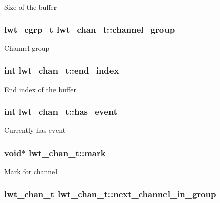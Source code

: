 Size of the buffer \hypertarget{structlwt__channel_a6e34c7480bc23f6ea1db12c69adec0d9}{
\subsubsection[{channel\+\_\+group}]{\setlength{\rightskip}{0pt plus 5cm}lwt\+\_\+cgrp\+\_\+t lwt\+\_\+chan\+\_\+t\+::channel\+\_\+group}}\label{structlwt__channel_a6e34c7480bc23f6ea1db12c69adec0d9}
Channel group \hypertarget{structlwt__channel_abb64ed65a8a46420c6dddf1758de401e}{
\subsubsection[{end\+\_\+index}]{\setlength{\rightskip}{0pt plus 5cm}int lwt\+\_\+chan\+\_\+t\+::end\+\_\+index}}\label{structlwt__channel_abb64ed65a8a46420c6dddf1758de401e}
End index of the buffer \hypertarget{structlwt__channel_a188eb6696d72cbe1d1295fb2736ec20c}{
\subsubsection[{has\+\_\+event}]{\setlength{\rightskip}{0pt plus 5cm}int lwt\+\_\+chan\+\_\+t\+::has\+\_\+event}}\label{structlwt__channel_a188eb6696d72cbe1d1295fb2736ec20c}
Currently has event \hypertarget{structlwt__channel_a83384d85ee5b6089fdec51fd65bf33d0}{
\subsubsection[{mark}]{\setlength{\rightskip}{0pt plus 5cm}void$\ast$ lwt\+\_\+chan\+\_\+t\+::mark}}\label{structlwt__channel_a83384d85ee5b6089fdec51fd65bf33d0}
Mark for channel \hypertarget{structlwt__channel_afb44a3a49de36cb6e5bf0c64651b7654}{
\subsubsection[{next\+\_\+channel\+\_\+in\+\_\+group}]{\setlength{\rightskip}{0pt plus 5cm}lwt\+\_\+chan\+\_\+t lwt\+\_\+chan\+\_\+t\+::next\+\_\+channel\+\_\+in\+\_\+group}}\label{structlwt__channel_afb44a3a49de36cb6e5bf0c64651b7654}
